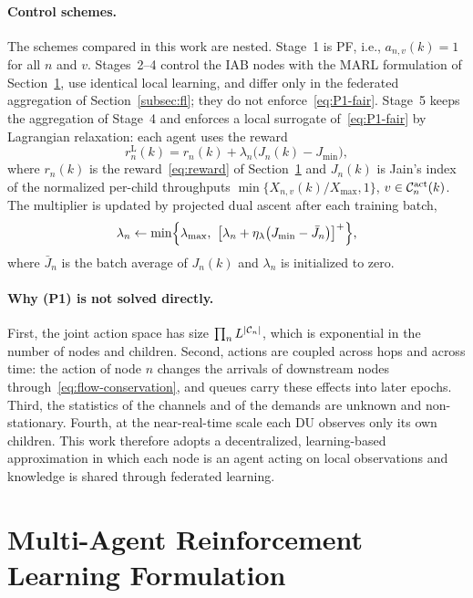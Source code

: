 \begin{EnChapter}
\paragraph{Control schemes.}
The schemes compared in this work are nested. Stage~1 is PF, i.e., $a_{n,v}(k) = 1$
for all $n$ and $v$. Stages~2--4 control the IAB nodes with the MARL formulation of
Section~\ref{subsec:marl}, use identical local learning, and differ only in the
federated aggregation of Section~\ref{subsec:fl}; they do not
enforce~\eqref{eq:P1-fair}. Stage~5 keeps the aggregation of Stage~4 and enforces a local surrogate of~\eqref{eq:P1-fair} by
Lagrangian relaxation: each agent uses the reward
\begin{equation}
  r_n^{\mathrm{L}}(k) = r_n(k) + \lambda_n \bigl( J_n(k) - J_{\min} \bigr),
  \label{eq:lagrangian}
\end{equation}
where $r_n(k)$ is the reward~\eqref{eq:reward} of Section~\ref{subsec:marl} and
$J_n(k)$ is Jain's index of the normalized per-child throughputs
$\min\{X_{n,v}(k)/X_{\max}, 1\}$, $v \in \mathcal{C}_n^{\mathrm{act}}(k)$. The multiplier is
updated by projected dual ascent after each training batch,
\begin{equation}
  \lambda_n \leftarrow \min\Bigl\{ \lambda_{\max},\ \bigl[ \lambda_n + \eta_\lambda \bigl( J_{\min} - \bar J_n \bigr) \bigr]^{+} \Bigr\},
  \label{eq:dual}
\end{equation}
where $\bar J_n$ is the batch average of $J_n(k)$ and $\lambda_n$ is initialized
to zero.

\paragraph{Why (P1) is not solved directly.}
First, the joint action space has size $\prod_{n} L^{|\mathcal{C}_n|}$, which is
exponential in the number of nodes and children. Second, actions are coupled across
hops and across time: the action of node $n$ changes the arrivals of
downstream nodes through~\eqref{eq:flow-conservation}, and queues carry these
effects into later epochs. Third, the statistics of the
channels and of the demands are unknown and non-stationary. Fourth, at the
near-real-time scale each DU observes only its own children. This work therefore
adopts a decentralized, learning-based approximation in which each node is an agent
acting on local observations and knowledge is shared through federated learning.

\section{Multi-Agent Reinforcement Learning Formulation}
\label{subsec:marl}


\end{EnChapter}
